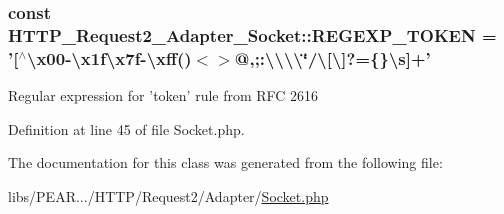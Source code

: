 \hypertarget{classHTTP__Request2__Adapter__Socket_a56beacc9218c6048c7f9ad5af80959eb}{
\subsubsection[{R\-E\-G\-E\-X\-P\-\_\-\-T\-O\-K\-E\-N}]{\setlength{\rightskip}{0pt plus 5cm}const H\-T\-T\-P\-\_\-\-Request2\-\_\-\-Adapter\-\_\-\-Socket\-::\-R\-E\-G\-E\-X\-P\-\_\-\-T\-O\-K\-E\-N = '\mbox{[}$^\wedge$\textbackslash{}x00-\/\textbackslash{}x1f\textbackslash{}x7f-\/\textbackslash{}xff()$<$$>$@,;\-:\textbackslash{}\textbackslash{}\textbackslash{}\textbackslash{}\char`\"{}/\textbackslash{}\mbox{[}\textbackslash{}\mbox{]}?=\{\}\textbackslash{}s\mbox{]}+'}}\label{classHTTP__Request2__Adapter__Socket_a56beacc9218c6048c7f9ad5af80959eb}
Regular expression for 'token' rule from R\-F\-C 2616 

Definition at line 45 of file Socket.\-php.



The documentation for this class was generated from the following file\-:\begin{DoxyCompactItemize}
\item 
libs/\-P\-E\-A\-R.../\-H\-T\-T\-P/\-Request2/\-Adapter/\hyperlink{Socket_8php}{Socket.\-php}\end{DoxyCompactItemize}
